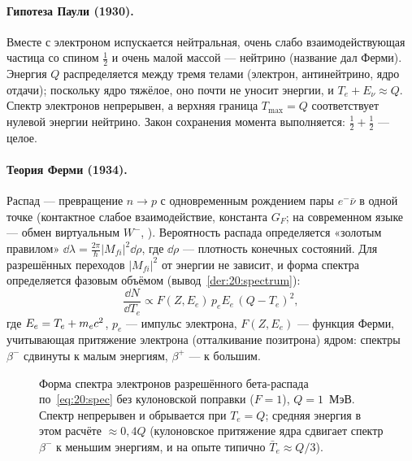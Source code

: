 \paragraph{Гипотеза Паули (1930).} Вместе с электроном испускается нейтральная, очень слабо взаимодействующая частица со спином
$\frac12$ и очень малой массой — нейтрино (название дал Ферми). Энергия $Q$ распределяется между тремя телами (электрон,
антинейтрино, ядро отдачи); поскольку ядро тяжёлое, оно почти не уносит энергии, и $T_e+E_\nu\approx Q$. Спектр электронов
непрерывен, а верхняя граница $T_{\max}=Q$ соответствует нулевой энергии нейтрино. Закон сохранения момента
выполняется: $\frac12+\frac12$ — целое.

\paragraph{Теория Ферми (1934).} Распад — превращение $n\to p$ с одновременным рождением пары $e^-\bar\nu$ в одной точке (контактное
слабое взаимодействие, константа $G_F$; на современном языке — обмен виртуальным $W^-$, ). Вероятность распада
определяется «золотым правилом» $\dd\lambda=\frac{2\pi}{\hbar}|M_{fi}|^2\dd\rho$, где $\dd\rho$ — плотность конечных состояний. Для
разрешённых переходов $|M_{fi}|^2$ от энергии не зависит, и форма спектра определяется фазовым объёмом (вывод~\ref{der:20:spectrum}):
\begin{equation}\label{eq:20:spec}
  \frac{\dd N}{\dd T_e}\propto F(Z,E_e)\,p_eE_e\,(Q-T_e)^2 ,
\end{equation}
где $E_e=T_e+m_e c^2$, $p_e$ — импульс электрона, $F(Z,E_e)$ — функция Ферми, учитывающая притяжение электрона (отталкивание
позитрона) ядром: спектры $\beta^-$ сдвинуты к малым энергиям, $\beta^+$ — к большим.

\begin{figure}[htbp]
\centering
{}
\caption{Форма спектра электронов разрешённого бета-распада по~\eqref{eq:20:spec} без кулоновской поправки
($F=1$), $Q=1$~МэВ. Спектр непрерывен и обрывается при $T_e=Q$; средняя энергия в этом расчёте $\approx0{,}4Q$ (кулоновское притяжение ядра сдвигает спектр $\beta^-$ к меньшим энергиям, и на опыте типично $\bar T_e\approx Q/3$).}
\label{fig:20:spectrum}
\end{figure}


